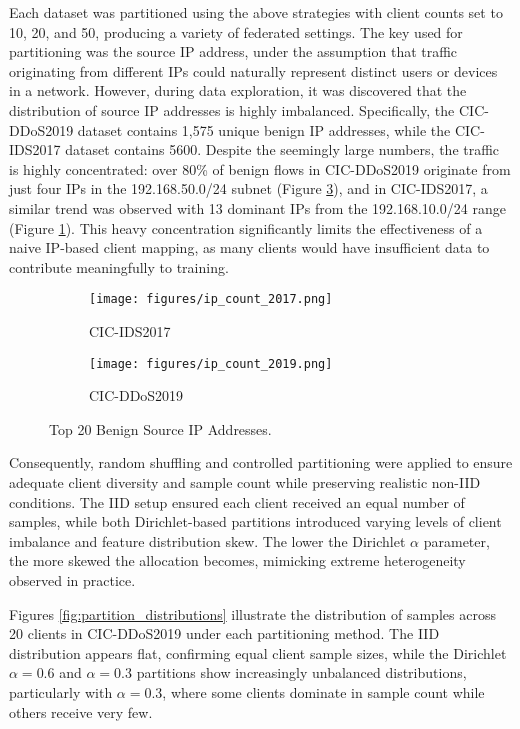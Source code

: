 Each dataset was partitioned using the above strategies with client counts set to 10, 20, and 50, producing a variety of federated settings. The key used for partitioning was the source IP address, under the assumption that traffic originating from different IPs could naturally represent distinct users or devices in a network. However, during data exploration, it was discovered that the distribution of source IP addresses is highly imbalanced. Specifically, the CIC-DDoS2019 dataset contains 1,575 unique benign IP addresses, while the CIC-IDS2017 dataset contains 5600. Despite the seemingly large numbers, the traffic is highly concentrated: over 80\% of benign flows in CIC-DDoS2019 originate from just four IPs in the 192.168.50.0/24 subnet (Figure \ref{fig:src_ip_count_2019}), and in CIC-IDS2017, a similar trend was observed with 13 dominant IPs from the 192.168.10.0/24 range (Figure \ref{fig:src_ip_count_2017}). This heavy concentration significantly limits the effectiveness of a naive IP-based client mapping, as many clients would have insufficient data to contribute meaningfully to training. 

\begin{figure}[h]
    \centering

    \begin{subfigure}[b]{0.49\textwidth}
        \centering
        \texttt{[image: figures/ip\_count\_2017.png]}
        \caption{CIC-IDS2017}
        \label{fig:src_ip_count_2017}
    \end{subfigure}
    \hfill
    \begin{subfigure}[b]{0.49\textwidth}
        \centering
        \texttt{[image: figures/ip\_count\_2019.png]}
        \caption{CIC-DDoS2019}
        \label{fig:src_ip_count_2019}
    \end{subfigure}

    \caption{Top 20 Benign Source IP Addresses.}
\end{figure}

Consequently, random shuffling and controlled partitioning were applied to ensure adequate client diversity and sample count while preserving realistic non-IID conditions. The IID setup ensured each client received an equal number of samples, while both Dirichlet-based partitions introduced varying levels of client imbalance and feature distribution skew. The lower the Dirichlet $\alpha$ parameter, the more skewed the allocation becomes, mimicking extreme heterogeneity observed in practice.

Figures \ref{fig:partition_distributions} illustrate the distribution of samples across 20 clients in CIC-DDoS2019 under each partitioning method. The IID distribution appears flat, confirming equal client sample sizes, while the Dirichlet $\alpha=0.6$ and $\alpha=0.3$ partitions show increasingly unbalanced distributions, particularly with $\alpha=0.3$, where some clients dominate in sample count while others receive very few.

